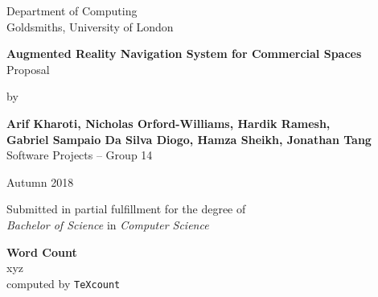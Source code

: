 \documentclass[12pt]{report}
\newcommand\blankpage{%
    \null
    \thispagestyle{empty}%
    \addtocounter{page}{-1}%
    \newpage}
\begin{document}
\begin{titlepage}
    \begin{center}
        \vspace*{1cm}
        Department of Computing\\
        Goldsmiths, University of London\\

        \vspace*{3.75cm}

        \textbf{\LARGE Augmented Reality Navigation System for Commercial Spaces}\\
        \vspace*{0.55cm}           
        {\large Proposal}\\
        \vspace*{0.15cm}           

        \vspace*{2cm}
        by\\
        \vspace*{0.25cm}   

        \textbf{Arif Kharoti, Nicholas Orford-Williams, Hardik Ramesh,\\}
        \textbf{Gabriel Sampaio Da Silva Diogo, Hamza Sheikh, Jonathan Tang\\}
        \vspace*{0.1cm}    
        Software Projects – Group 14\\  

        \vspace{2cm}

        Autumn 2018
        \vfill

        Submitted in partial fulfillment for the degree of\\
        \textit{Bachelor of Science} in \textit{Computer Science}

        \vspace{1.5cm}

    \end{center}
\end{titlepage}
\afterpage{\blankpage}
\thispagestyle{plain}

\begin{center}    
    \large
    \textbf{Word Count}\\
    xyz\\
    computed by \texttt{TeXcount}
\end{center}
\end{document}
